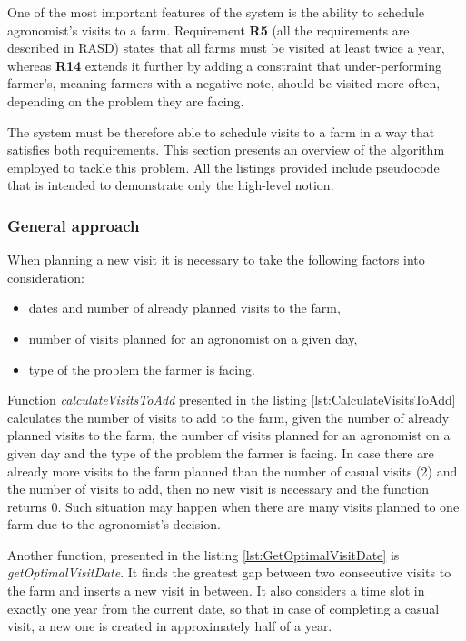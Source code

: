 One of the most important features of the system is the ability to schedule agronomist's visits to a farm. Requirement \textbf{R5} (all the requirements are described in RASD) states that all farms must be visited at least twice a year, whereas \textbf{R14} extends it further by adding a constraint that under-performing farmer's, meaning farmers with a negative note, should be visited more often, depending on the problem they are facing.

The system must be therefore able to schedule visits to a farm in a way that satisfies both requirements. This section presents an overview of the algorithm employed to tackle this problem. All the listings provided include pseudocode that is intended to demonstrate only the high-level notion.

\subsubsection*{General approach}

When planning a new visit it is necessary to take the following factors into consideration:
\begin{itemize}
    \item dates and number of already planned visits to the farm,
    \item number of visits planned for an agronomist on a given day,
    \item type of the problem the farmer is facing.
\end{itemize}

Function \textit{calculateVisitsToAdd} presented in the listing \ref{lst:CalculateVisitsToAdd} calculates the number of visits to add to the farm, given the number of already planned visits to the farm, the number of visits planned for an agronomist on a given day and the type of the problem the farmer is facing. In case there are already more visits to the farm planned than the number of casual visits (2) and the number of visits to add, then no new visit is necessary and the function returns 0. Such situation may happen when there are many visits planned to one farm due to the agronomist's decision.



Another function, presented in the listing \ref{lst:GetOptimalVisitDate} is \textit{getOptimalVisitDate}. It finds the greatest gap between two consecutive visits to the farm and inserts a new visit in between. It also considers a time slot in exactly one year from the current date, so that in case of completing a casual visit, a new one is created in approximately half of a year.

